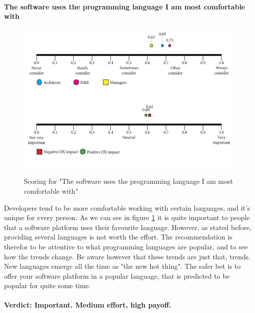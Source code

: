 \documentclass{article}
\begin{document}
\paragraph{The software uses the programming language I am most comfortable with}
\begin{figure}[H]
\centering
\includegraphics[width=\linewidth]{scorelines/aspect15.png}
\includegraphics[width=\linewidth]{dxscorelines/dxaspect15.png}
\caption{Scoring for "The software uses the programming language I am most comfortable with"}
\label{fig:aspect15}
\end{figure}
Developers tend to be more comfortable working with certain languages, and it's unique for every person. As we can see in figure \ref{fig:aspect15} it is quite important to people that a software platform uses their favourite language. However, as stated before, providing several languages is not worth the effort. The recommendation is therefor to be attentive to what programming languages are popular, and to see how the trends change. Be aware however that these trends are just that, trends. New languages emerge all the time as "the new hot thing". The safer bet is to offer your software platform in a popular language, that is predicted to be popular for quite some time. \\ \\
\textbf{Verdict: Important. Medium effort, high payoff.}
\end{document}
